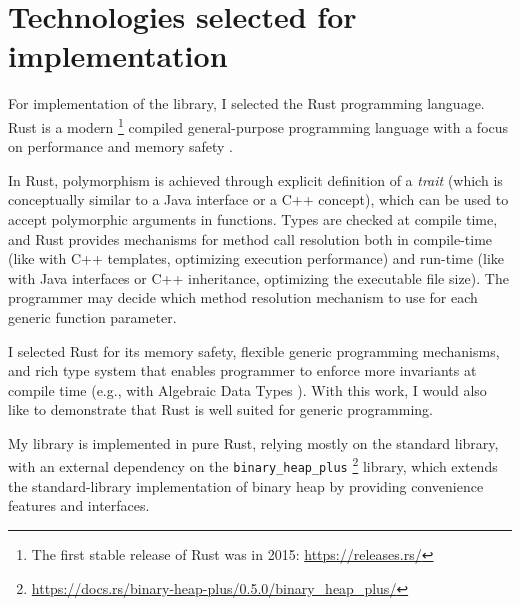 \section{Technologies selected for implementation}

For implementation of the library, I selected the Rust programming language. Rust is a modern
\footnote{The first stable release of Rust was in 2015: \url{https://releases.rs/}}
compiled general-purpose programming language with a focus on performance and memory safety
\cite{klabnik2023rust}.

In Rust, polymorphism is achieved through explicit definition of a
\emph{trait} \cite{klabnik2023rust} (which is conceptually similar to a Java interface or a
C++ concept),
which can be used to accept polymorphic arguments in functions.
Types are checked at compile time, and Rust provides mechanisms for method call
resolution both in compile-time (like with C++ templates, optimizing execution performance)
and run-time (like with Java interfaces or C++ inheritance, optimizing the executable file
size). The programmer may decide which method resolution mechanism to use for each generic
function parameter.

I selected Rust for its memory safety, flexible generic programming mechanisms, and rich
type system that enables programmer to enforce more invariants at compile time (e.g., with
Algebraic Data Types \cite{klabnik2023rust}). With this work, I would also like to demonstrate
that Rust is well suited for generic programming.

My library is implemented in pure Rust, relying mostly on the standard library, with an
external dependency on the \texttt{binary\_heap\_plus}
\footnote{\url{https://docs.rs/binary-heap-plus/0.5.0/binary_heap_plus/}} library,
which extends the standard-library implementation of binary heap by providing convenience
features and interfaces.



